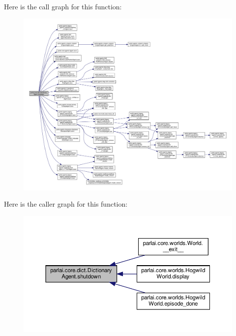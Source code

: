 Here is the call graph for this function\+:
\nopagebreak
\begin{figure}[H]
\begin{center}
\leavevmode
\includegraphics[width=350pt]{classparlai_1_1core_1_1dict_1_1DictionaryAgent_aea9aca40dd1bb1976f4042565b172d88_cgraph}
\end{center}
\end{figure}
Here is the caller graph for this function\+:
\nopagebreak
\begin{figure}[H]
\begin{center}
\leavevmode
\includegraphics[width=350pt]{classparlai_1_1core_1_1dict_1_1DictionaryAgent_aea9aca40dd1bb1976f4042565b172d88_icgraph}
\end{center}
\end{figure}
\mbox{\label{classparlai_1_1core_1_1dict_1_1DictionaryAgent_a84cb4fabf5d0e92e3f80ac16bdfd0ccc}} 
